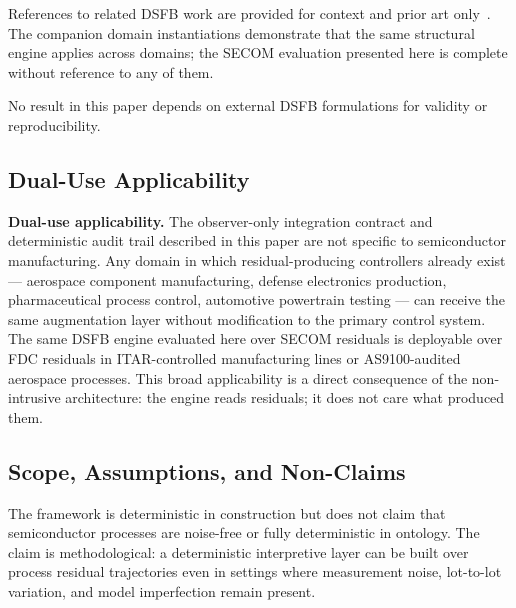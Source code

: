 \documentclass[11pt,letterpaper]{article}
\theoremstyle{scresult}
\begin{document}
References to related DSFB work are provided for context and prior art
only~\cite{dsfb-semiotics-general,dsfb-framework,dsfb-hret,dsfb-plasma-state,%
dsfb-oscillatory,dsfb-hierarchical,dsfb-ddmf,dsfb-add,dsfb-dscd,%
dsfb-tcct-srd,dsfb-tmtr,dsfb-stack,dsfb-swarm,dsfb-lattice,dsfb-survey,%
dsfb-battery,dsfb-laplacian,dsfb-threebody,dsfb-gradflow}. The companion
domain instantiations demonstrate that the same structural engine applies across
domains; the SECOM evaluation presented here is complete without reference to
any of them.

No result in this paper depends on external DSFB formulations for validity or
reproducibility.

\subsection{Dual-Use Applicability}

\textbf{Dual-use applicability.}
The observer-only integration contract and deterministic audit trail described
in this paper are not specific to semiconductor manufacturing. Any domain in which
residual-producing controllers already exist --- aerospace component
manufacturing, defense electronics production, pharmaceutical process control,
automotive powertrain testing --- can receive the same augmentation layer without
modification to the primary control system. The same DSFB engine evaluated here
over SECOM residuals is deployable over FDC residuals in ITAR-controlled
manufacturing lines or AS9100-audited aerospace processes. This broad
applicability is a direct consequence of the non-intrusive architecture: the
engine reads residuals; it does not care what produced them.

\subsection{Scope, Assumptions, and Non-Claims}

The framework is deterministic in construction but does not claim that
semiconductor processes are noise-free or fully deterministic in ontology.
The claim is methodological: a deterministic interpretive layer can be built
over process residual trajectories even in settings where measurement noise,
lot-to-lot variation, and model imperfection remain present.
\end{document}

